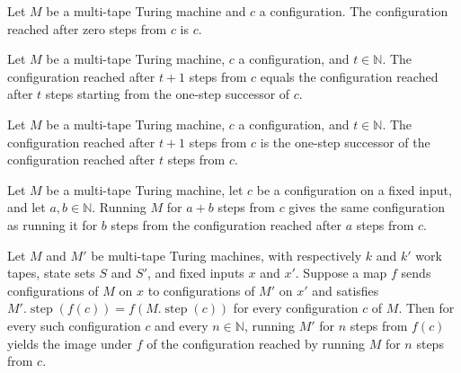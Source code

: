 \begin{lemma}
\label{Turing.MultiTapeTM.runFrom_zero}
\leanok
{}
Let $M$ be a multi-tape Turing machine and $c$ a configuration. The configuration
reached after zero steps from $c$ is $c$.
\end{lemma}

\begin{lemma}
\label{Turing.MultiTapeTM.runFrom_succ_eq_step}
\leanok
{}
Let $M$ be a multi-tape Turing machine, $c$ a configuration, and $t\in\mathbb{N}$. The
configuration reached after $t+1$ steps from $c$ equals the configuration reached after
$t$ steps starting from the one-step successor of $c$.
\end{lemma}

\begin{lemma}
\label{Turing.MultiTapeTM.runFrom_succ_eq_step'}
\leanok
{}
Let $M$ be a multi-tape Turing machine, $c$ a configuration, and $t\in\mathbb{N}$. The
configuration reached after $t+1$ steps from $c$ is the one-step successor of the
configuration reached after $t$ steps from $c$.
\end{lemma}

\begin{lemma}
\label{Turing.MultiTapeTM.runFrom_add}
\leanok
{}
Let $M$ be a multi-tape Turing machine, let $c$ be a configuration on a fixed input, and
let $a,b\in\mathbb{N}$. Running $M$ for $a+b$ steps from $c$ gives the same
configuration as running it for $b$ steps from the configuration reached after $a$ steps
from $c$.
\end{lemma}

\begin{lemma}
\label{Turing.MultiTapeTM.runFrom_comm_of_step}
\leanok
{}
Let $M$ and $M'$ be multi-tape Turing machines, with respectively $k$ and $k'$ work
tapes, state sets $S$ and $S'$, and fixed inputs $x$ and $x'$. Suppose a map $f$ sends
configurations of $M$ on $x$ to configurations of $M'$ on $x'$ and satisfies
$M'.\operatorname{step}(f(c))=f(M.\operatorname{step}(c))$ for every configuration $c$
of $M$. Then for every such configuration $c$ and every $n\in\mathbb{N}$, running $M'$
for $n$ steps from $f(c)$ yields the image under $f$ of the configuration reached by
running $M$ for $n$ steps from $c$.
\end{lemma}

